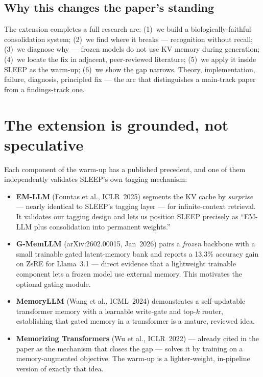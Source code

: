 \documentclass[11pt]{article}
\begin{document}
\subsection{Why this changes the paper's standing}
The extension completes a full research arc: (1)~we build a biologically-faithful consolidation system; (2)~we find where it breaks --- recognition without recall; (3)~we diagnose why --- frozen models do not use KV memory during generation; (4)~we locate the fix in adjacent, peer-reviewed literature; (5)~we apply it inside SLEEP as the warm-up; (6)~we show the gap narrows. Theory, implementation, failure, diagnosis, principled fix --- the arc that distinguishes a main-track paper from a findings-track one.

\section{The extension is grounded, not speculative}

Each component of the warm-up has a published precedent, and one of them independently validates SLEEP's own tagging mechanism:

\begin{itemize}
  \item \textbf{EM-LLM} (Fountas et al., ICLR~2025) segments the KV cache by \emph{surprise} --- nearly identical to SLEEP's tagging layer --- for infinite-context retrieval. It validates our tagging design and lets us position SLEEP precisely as ``EM-LLM plus consolidation into permanent weights.''
  \item \textbf{G-MemLLM} (arXiv:2602.00015, Jan~2026) pairs a \emph{frozen} backbone with a small trainable gated latent-memory bank and reports a 13.3\% accuracy gain on ZsRE for Llama~3.1 --- direct evidence that a lightweight trainable component lets a frozen model use external memory. This motivates the optional gating module.
  \item \textbf{MemoryLLM} (Wang et al., ICML~2024) demonstrates a self-updatable transformer memory with a learnable write-gate and top-$k$ router, establishing that gated memory in a transformer is a mature, reviewed idea.
  \item \textbf{Memorizing Transformers} (Wu et al., ICLR~2022) --- already cited in the paper as the mechanism that closes the gap --- solves it by training on a memory-augmented objective. The warm-up is a lighter-weight, in-pipeline version of exactly that idea.
\end{itemize}
\end{document}
